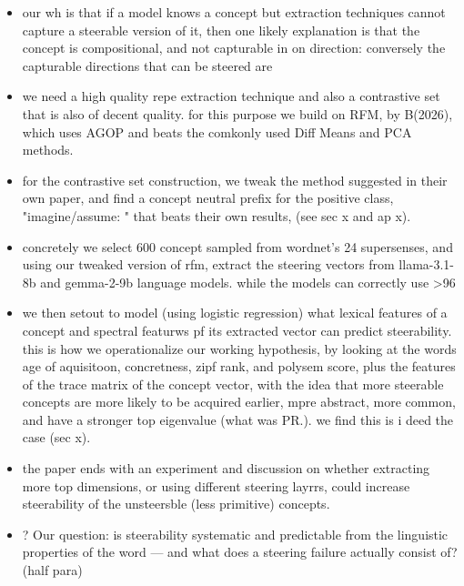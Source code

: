 \documentclass[11pt]{article}
\newenvironment{outline}{\color{gray!70!black}\begin{itemize}[leftmargin=1.2em,itemsep=1pt]}{\end{itemize}\color{black}}
\begin{document}
\begin{outline}
\item our wh is that if a model knows a concept but extraction techniques cannot capture a steerable version of it, then one likely explanation is that the concept is compositional, and not capturable in on direction: conversely the capturable directions that can be steered are
\item we need a high quality repe extraction technique and also a contrastive set that is also of decent quality. for this purpose we build on RFM, by B(2026), which uses AGOP and beats the comkonly used Diff Means and PCA methods.
\item for the contrastive set construction, we tweak the method suggested in their own paper, and find a concept neutral prefix for the positive class, "imagine/assume: " that beats their own results, (see sec x and ap x).
\item concretely we select 600 concept sampled from wordnet's 24 supersenses, and using our tweaked version of rfm, extract the steering vectors from llama-3.1-8b and gemma-2-9b language models. while the models can correctly use >96%
\item we then setout to model (using logistic regression) what lexical features of a concept and spectral featurws pf its extracted vector can predict steerability. this is how we operationalize our working hypothesis, by looking at the words age of aquisitoon, concretness, zipf rank, and polysem score, plus the features of the trace matrix of the concept vector, with the idea that more steerable concepts are more likely to be acquired earlier, mpre abstract, more common, and have a stronger top eigenvalue (what was PR.). we find this is i deed the case (sec x).
\item the paper ends with an experiment and discussion on whether extracting more top dimensions, or using different steering layrrs, could increase steerability of the unsteersble (less primitive) concepts.
\item ? Our question: is steerability systematic and predictable from the linguistic properties of the word --- and what does a steering failure actually consist of? (half para)



\end{outline}
\end{document}
